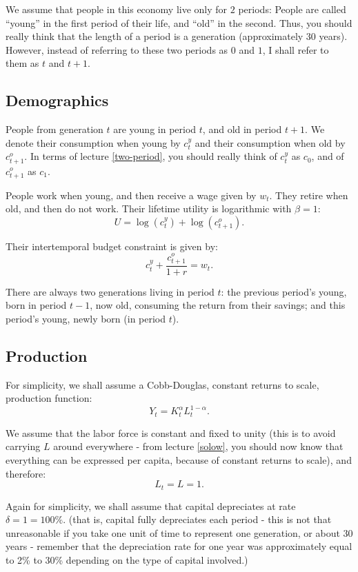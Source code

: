 \documentclass[]{book}
\theoremstyle{definition}
\theoremstyle{definition}
\theoremstyle{definition}
\theoremstyle{remark}
\begin{document}
We assume that people in this economy live only for \(2\) periods:
People are called ``young'' in the first period of their life, and
``old'' in the second. Thus, you should really think that the length of
a period is a generation (approximately 30 years). However, instead of
referring to these two periods as \(0\) and \(1\), I shall refer to them
as \(t\) and \(t+1\).

\subsection{Demographics}\label{demographics}

People from generation \(t\) are young in period \(t\), and old in
period \(t+1\). We denote their consumption when young by \(c_{t}^{y}\)
and their consumption when old by \(c_{t+1}^{o}\). In terms of lecture
\ref{two-period}, you should really think of \(c_{t}^{y}\) as \(c_{0}\),
and of \(c_{t+1}^{o}\) as \(c_{1}\).

People work when young, and then receive a wage given by \(w_{t}\). They
retire when old, and then do not work. Their lifetime utility is
logarithmic with \(\beta=1\): \[U=\log(c_{t}^{y})+\log(c_{t+1}^{o}).\]

Their intertemporal budget constraint is given by:
\[c_{t}^{y}+\frac{c_{t+1}^{o}}{1+r}=w_{t}.\]

There are always two generations living in period \(t\): the previous
period's young, born in period \(t-1\), now old, consuming the return
from their savings; and this period's young, newly born (in period
\(t\)).

\subsection{Production}\label{production}

For simplicity, we shall assume a Cobb-Douglas, constant returns to
scale, production function: \[Y_{t}=K_{t}^{\alpha}L_{t}^{1-\alpha}.\]

We assume that the labor force is constant and fixed to unity (this is
to avoid carrying \(L\) around everywhere - from lecture \ref{solow},
you should now know that everything can be expressed per capita, because
of constant returns to scale), and therefore: \[L_{t}=L=1.\]

Again for simplicity, we shall assume that capital depreciates at rate
\(\delta=1=100\%\). (that is, capital fully depreciates each period -
this is not that unreasonable if you take one unit of time to represent
one generation, or about 30 years - remember that the depreciation rate
for one year was approximately equal to 2\% to 30\% depending on the
type of capital involved.)
\end{document}
